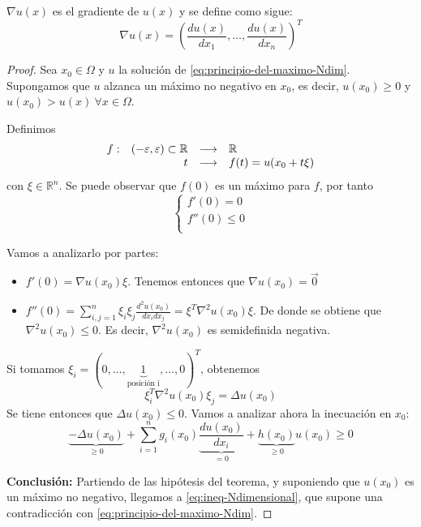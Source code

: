 $\nabla u(x)$ es el gradiente de $u(x)$ y se define como sigue:
$$\nabla u(x) = \left(\frac{du(x)}{dx_1}, \hdots, \frac{du(x)}{dx_n}\right)^T$$
\begin{proof}
Sea $x_0\in \Omega$ y $u$ la solución de \eqref{eq:principio-del-maximo-Ndim}. Supongamos que $u$ alzanca un máximo no negativo en $x_0$, es decir, $u(x_0) \ge 0$ y $u(x_0) > u(x)\ \forall x \in \Omega$.

Definimos 
\begin{equation*}
\begin{array}{l r l l}
f: & (-\varepsilon, \varepsilon) \subset\mathbb{R} & \longrightarrow  & \mathbb{R}\\
& t & \longrightarrow & f(t) = u(x_0+t\xi)\\
\end{array}
\end{equation*}
con $\xi\in\mathbb{R}^n$.
Se puede observar que $f(0)$ es un máximo para $f$, por tanto
\begin{equation}
\left\{
\begin{array}{l}
f'(0) = 0\\
f''(0) \le 0\\
\end{array}
\right.
\end{equation}

Vamos a analizarlo por partes:
\begin{itemize}
\item $f'(0) = \nabla u(x_0)\xi$. Tenemos entonces que $\nabla u(x_0) = \vec{0}$
\item $f''(0) = \sum_{i,j=1}^n \xi_i\xi_j\frac{d^2u(x_0)}{dx_idx_j} = \xi^T\nabla^2u(x_0)\xi$. De donde se obtiene que $\nabla^2u(x_0) \le 0$. Es decir, $\nabla^2u(x_0)$ es semidefinida negativa.
\end{itemize}

Si tomamos $\xi_i = (0,\hdots, \underbrace{1}_{\text{posición i}}, \hdots, 0)^T$, obtenemos
$$\xi_i^T\nabla^2u(x_0)\xi_j = \Delta u(x_0)$$
Se tiene entonces que $\Delta u(x_0) \leq 0$.
Vamos a analizar ahora la inecuación en $x_0$:
\begin{equation}\label{eq:ineq-Ndimensional}
\underbrace{-\Delta u(x_0)}_{\ge 0} + \sum_{i=1}^n g_i(x_0)\underbrace{\frac{du(x_0)}{dx_i}}_{=0}+\underbrace{h(x_0)}_{\ge 0}u(x_0) \ge 0
\end{equation}

\noindent\textbf{Conclusión:}
Partiendo de las hipótesis del teorema, y suponiendo que $u(x_0)$ es un máximo no negativo, llegamos a \eqref{eq:ineq-Ndimensional}, que supone una contradicción con \eqref{eq:principio-del-maximo-Ndim}.
\end{proof}

